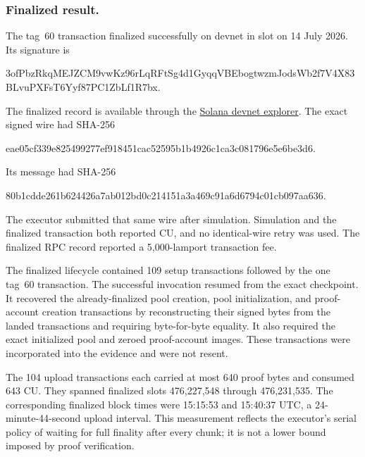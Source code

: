\subsubsection{Finalized result.}
\label{sec:evaluation-devnet-result}

The tag~60 transaction finalized successfully on devnet in slot
\ProfileDevnetSlot{} on
14 July 2026.  Its signature is
\begin{center}
  {\scriptsize\ttfamily
  3ofPbzRkqMEJZCM9vwKz96rLqRFtSg4d1GyqqVBEbogtwzmJodsWb2f7V4X83BLvuPXFsT6Yyf87PC1ZbLf1R7bx}.
\end{center}
The finalized record is available through the
\href{https://explorer.solana.com/tx/3ofPbzRkqMEJZCM9vwKz96rLqRFtSg4d1GyqqVBEbogtwzmJodsWb2f7V4X83BLvuPXFsT6Yyf87PC1ZbLf1R7bx?cluster=devnet}{Solana devnet explorer}.
The exact signed wire had SHA-256
\begin{center}
  {\scriptsize\ttfamily
  eae05cf339e825499277ef918451cac52595b1b4926c1ca3c081796e5e6be3d6}.
\end{center}
Its message had SHA-256
\begin{center}
  {\scriptsize\ttfamily
  80b1cdde261b624426a7ab012bd0c214151a3a469c91a6d6794c01cb097aa636}.
\end{center}

The executor submitted that same wire
after simulation.  Simulation and the finalized transaction both reported
\ProfileDevnetComputeUnits{} CU, and no identical-wire retry was used.  The
finalized RPC record
reported a 5,000-lamport transaction fee.

The finalized lifecycle contained 109 setup transactions followed by the one
tag~60 transaction.  The successful invocation resumed from the exact
 checkpoint.  It
recovered the already-finalized pool creation, pool initialization, and
proof-account creation transactions by reconstructing their signed bytes from
the landed transactions and requiring byte-for-byte equality.  It also
required the exact initialized pool and zeroed proof-account images.  These
transactions were incorporated into the evidence and were not resent.

The 104 upload transactions each carried at most 640 proof bytes and consumed
643 CU.  They spanned finalized slots 476,227,548 through 476,231,535.  The
corresponding finalized block times were 15:15:53 and 15:40:37 UTC, a
24-minute-44-second upload interval.  This measurement reflects the executor's
serial policy of waiting for full finality after every chunk; it is not a
lower bound imposed by proof verification.

